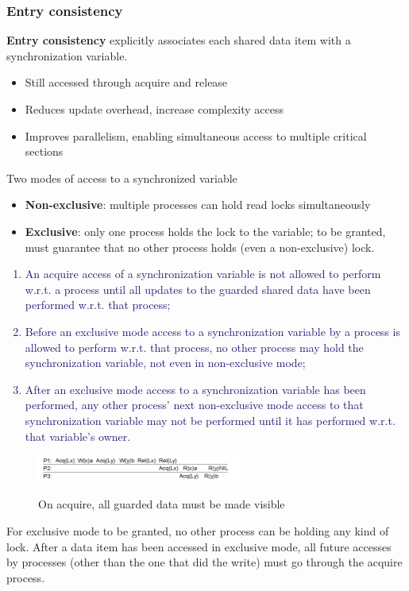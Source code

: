 \documentclass[10pt,a4paper]{article}
\begin{document}
\subsubsection{Entry consistency}
\textbf{Entry consistency} explicitly associates each shared data item with a synchronization variable. 
\begin{itemize}
	\item Still accessed through acquire and release
	\item Reduces update overhead, increase complexity access
	\item Improves parallelism, enabling simultaneous access to multiple critical sections
\end{itemize}
Two modes of access to a synchronized variable
\begin{itemize}
	\item \textbf{Non-exclusive}: multiple processes can hold read locks simultaneously
	\item \textbf{Exclusive}: only one process holds the lock to the variable; to be granted, must guarantee that no other process holds (even a non-exclusive) lock.
\end{itemize}
\textcolor{MidnightBlue}{
\begin{enumerate}
	\item An acquire access of a synchronization variable is not allowed to perform w.r.t. a process until all updates to the guarded shared data have been performed w.r.t. that process;
	\item Before an exclusive mode access to a synchronization variable by a process is allowed to perform w.r.t. that process, no other process may hold the synchronization variable, not even in non-exclusive mode;
	\item After an exclusive mode access to a synchronization variable has been performed, any other process' next non-exclusive mode access to that synchronization variable may not be performed until it has performed w.r.t. that variable's owner.
\end{enumerate}}
\begin{figure}[h!]
 \hfill \includegraphics[width=190pt]{images/entry.png}\hspace*{\fill}
  \label{fig:entry}
  \caption{On acquire, all guarded data must be made visible}
\end{figure}
For exclusive mode to be granted, no other process can be holding any kind of lock. After a data item has been accessed in exclusive mode, all future accesses by processes (other than the one that did the write) must go through the acquire process. \\
\end{document}
